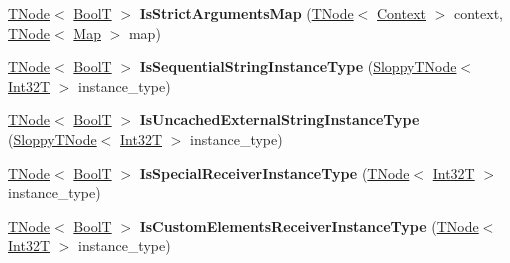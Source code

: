 \begin{DoxyCompactItemize}
\mbox{\hyperlink{classv8_1_1internal_1_1compiler_1_1TNode}{T\+Node}}$<$ \mbox{\hyperlink{structv8_1_1internal_1_1BoolT}{BoolT}} $>$ {\bfseries Is\+Strict\+Arguments\+Map} (\mbox{\hyperlink{classv8_1_1internal_1_1compiler_1_1TNode}{T\+Node}}$<$ \mbox{\hyperlink{classv8_1_1internal_1_1Context}{Context}} $>$ context, \mbox{\hyperlink{classv8_1_1internal_1_1compiler_1_1TNode}{T\+Node}}$<$ \mbox{\hyperlink{classv8_1_1internal_1_1Map}{Map}} $>$ map)
\item 
\mbox{\label{classv8_1_1internal_1_1CodeStubAssembler_a0ba57d6448904cc5dcc0e846bb655b37}} 
\mbox{\hyperlink{classv8_1_1internal_1_1compiler_1_1TNode}{T\+Node}}$<$ \mbox{\hyperlink{structv8_1_1internal_1_1BoolT}{BoolT}} $>$ {\bfseries Is\+Sequential\+String\+Instance\+Type} (\mbox{\hyperlink{classv8_1_1internal_1_1compiler_1_1SloppyTNode}{Sloppy\+T\+Node}}$<$ \mbox{\hyperlink{structv8_1_1internal_1_1Int32T}{Int32T}} $>$ instance\+\_\+type)
\item 
\mbox{\label{classv8_1_1internal_1_1CodeStubAssembler_a285cce28b7a532bb30d6067d4a8a3bf6}} 
\mbox{\hyperlink{classv8_1_1internal_1_1compiler_1_1TNode}{T\+Node}}$<$ \mbox{\hyperlink{structv8_1_1internal_1_1BoolT}{BoolT}} $>$ {\bfseries Is\+Uncached\+External\+String\+Instance\+Type} (\mbox{\hyperlink{classv8_1_1internal_1_1compiler_1_1SloppyTNode}{Sloppy\+T\+Node}}$<$ \mbox{\hyperlink{structv8_1_1internal_1_1Int32T}{Int32T}} $>$ instance\+\_\+type)
\item 
\mbox{\label{classv8_1_1internal_1_1CodeStubAssembler_ac082e8fc003a12cb91e575d917883610}} 
\mbox{\hyperlink{classv8_1_1internal_1_1compiler_1_1TNode}{T\+Node}}$<$ \mbox{\hyperlink{structv8_1_1internal_1_1BoolT}{BoolT}} $>$ {\bfseries Is\+Special\+Receiver\+Instance\+Type} (\mbox{\hyperlink{classv8_1_1internal_1_1compiler_1_1TNode}{T\+Node}}$<$ \mbox{\hyperlink{structv8_1_1internal_1_1Int32T}{Int32T}} $>$ instance\+\_\+type)
\item 
\mbox{\label{classv8_1_1internal_1_1CodeStubAssembler_a8d4c462d11bc0528171c78e892676739}} 
\mbox{\hyperlink{classv8_1_1internal_1_1compiler_1_1TNode}{T\+Node}}$<$ \mbox{\hyperlink{structv8_1_1internal_1_1BoolT}{BoolT}} $>$ {\bfseries Is\+Custom\+Elements\+Receiver\+Instance\+Type} (\mbox{\hyperlink{classv8_1_1internal_1_1compiler_1_1TNode}{T\+Node}}$<$ \mbox{\hyperlink{structv8_1_1internal_1_1Int32T}{Int32T}} $>$ instance\+\_\+type)

\end{DoxyCompactItemize}
